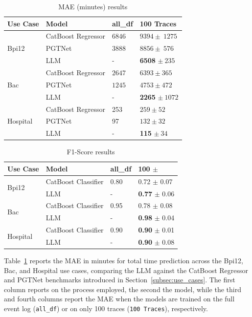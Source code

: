 \documentclass[manuscript,screen,review]{acmart}
\begin{document}
\begin{table}[t]
\centering
\caption{MAE (minutes) results}
\begin{tabular}{|l|l|l|l|}
\hline
\textbf{Use Case} & \textbf{Model} & \textbf{all\_df} & \textbf{100 Traces}  \\
\hline
\multirow{3}{*}{Bpi12}
& CatBoost Regressor  & $6846 $ & $9394 \pm\ 1275$ \\
& PGTNet  & $3888 $ & $8856 \pm\ 576$ \\
& LLM &- & \textbf{6508} $\pm\ 235$ \\
\hline
\multirow{3}{*}{Bac}
& CatBoost Regressor  & $2647 $ & $6393 \pm 365$ \\
& PGTNet  & $1245 $ & $4753 \pm 472 $ \\
& LLM  &- & \textbf{2265} $\pm\ 1072$ \\
\hline
\multirow{3}{*}{Hospital}
& CatBoost Regressor &253 & $259 \pm 52$ \\
& PGTNet  &97 & $132 \pm 32$ \\
& LLM  &- & \textbf{115} $ \pm\ 34$ \\
\hline
\end{tabular}
\label{tab:mae_results}
\end{table}

\begin{table}[t]
\centering
\caption{F1-Score results}
\begin{tabular}{|l|l|l|l|}
\hline
\textbf{Use Case} & \textbf{Model}  & \textbf{all\_df} & \textbf{100} $\pm$ \\
\hline
\multirow{2}{*}{Bpi12}& CatBoost Classifier & 0.80& 0.72 $\pm$ 0.07\\
& LLM & - & \textbf{0.77} $\pm$ 0.06\\
\hline
\multirow{2}{*}{Bac}& CatBoost Classifier & 0.95& 0.78 $\pm$ 0.08\\
& LLM  &-& \textbf{0.98} $\pm$ 0.04\\
\hline
\multirow{2}{*}{Hospital}& CatBoost Classifier &0.90& \textbf{0.90} $\pm$ 0.01\\
& LLM  & - & \textbf{0.90} $\pm$ 0.08\\
\hline
\end{tabular}
\label{tab:f1-score_results}
\end{table}


Table~\ref{tab:mae_results} reports the MAE in minutes for total time prediction across the Bpi12, Bac, and Hospital use cases, comparing the LLM against the CatBoost Regressor and PGTNet benchmarks introduced in Section~\ref{subsec:use_cases}. The first column reports on the process employed, the second the model, while the third and fourth columns report the MAE when the models are trained on the full event log (\texttt{all\_df}) or on only 100 traces (\texttt{100 Traces}), respectively.
\end{document}
